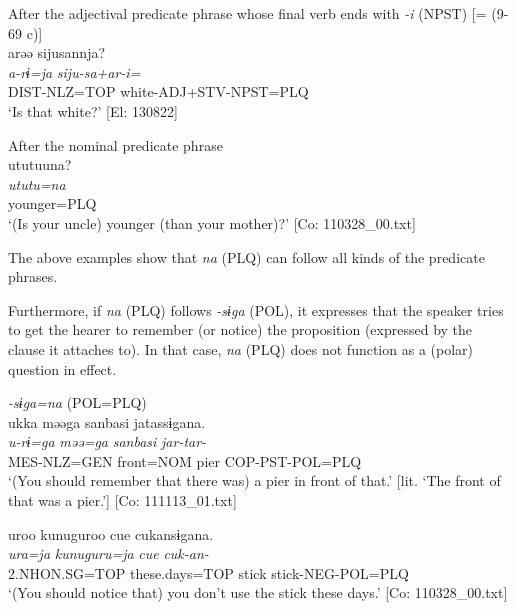   \ex After the adjectival predicate phrase whose final verb ends with \textit{{}-i} (NPST) [= (9-69 c)]\\
      \glll    arəə  sijusannja?\\
    \textit{a-rɨ=ja}  \textit{siju-sa+ar-i=}\\
    DIST-NLZ=TOP  white-ADJ+STV-NPST=PLQ\\
    \glt     ‘Is that white?’ [El: 130822]

  \ex After the nominal predicate phrase\\
      \glll    ututuuna?\\
    \textit{ututu}\footnotemark\textit{=na}\\
    younger=PLQ\\
  \glt     ‘(Is your uncle) younger (than your mother)?’  [Co: 110328\_00.txt]
  \z
\z{}

The above examples show that \textit{na} (PLQ) can follow all kinds of the predicate phrases.

  Furthermore, if \textit{na} (PLQ) follows \textit{-sɨga} (POL), it expresses that the speaker tries to get the hearer to remember (or notice) the proposition (expressed by the clause it attaches to). In that case, \textit{na} (PLQ) does not function as a (polar) question in effect.

\ea\label{ex:10.44}   \textit{{}-sɨga=na} (POL=PLQ)\\
  \ea  %
      \glll    ukka  məəga  sanbasi  jatassɨgana.\\
      \textit{u-rɨ=ga}  \textit{məə=ga}  \textit{sanbasi}  \textit{jar-tar-}\\
      MES-NLZ=GEN  front=NOM  pier  COP-PST-POL=PLQ\\
      \glt       ‘(You should remember that there was) a pier in front of that.’ [lit. ‘The front of that was a pier.’] [Co: 111113\_01.txt]

  \ex  %
      \glll    uroo  kunuguroo  {\textbar}cue{\textbar}  cukansɨgana.\\
      \textit{ura=ja}  \textit{kunuguru=ja}  \textit{cue}  \textit{cuk-an-}\\
      2.NHON.SG=TOP  these.days=TOP  stick  stick-NEG-POL=PLQ\\
      \glt       ‘(You should notice that) you don’t use the stick these days.’ [Co: 110328\_00.txt]
    \z
\z

